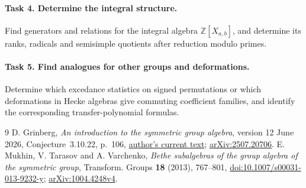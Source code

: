 \documentclass[11pt]{article}
\begin{document}
\paragraph{Task 4. Determine the integral structure.}
Find generators and relations for the integral algebra
\(\mathbb Z[X_{a,b}]\), and determine its ranks, radicals and
semisimple quotients after reduction modulo primes.

\paragraph{Task 5. Find analogues for other groups and deformations.}
Determine which excedance statistics on signed permutations or which
deformations in Hecke algebras give commuting coefficient families,
and identify the corresponding transfer-polynomial formulas.

\begin{thebibliography}{9}
D. Grinberg, \emph{An introduction to the symmetric group algebra},
version 12 June 2026, Conjecture~3.10.22, p.~106,
\href{https://www.cip.ifi.lmu.de/~grinberg/t/24s/sga.pdf}{author's current text};
\href{https://arxiv.org/abs/2507.20706}{arXiv:2507.20706}.
E. Mukhin, V. Tarasov and A. Varchenko,
\emph{Bethe subalgebras of the group algebra of the symmetric group},
Transform. Groups \textbf{18} (2013), 767--801,
\href{https://doi.org/10.1007/s00031-013-9232-y}{doi:10.1007/s00031-013-9232-y};
\href{https://arxiv.org/abs/1004.4248v4}{arXiv:1004.4248v4}.
\end{thebibliography}
\end{document}
